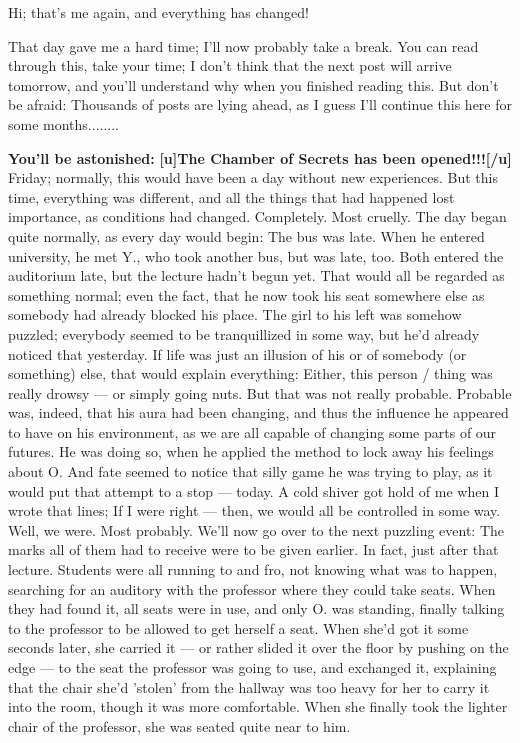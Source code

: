 Hi; that's me again, and everything has changed!

That day gave me a hard time; I'll now probably take a break. You can read through this, take your time; I don't think that the next post will arrive tomorrow, and you'll understand why when you finished reading this. 
But don't be afraid: Thousands of posts are lying ahead, as I guess I'll continue this here for some months........

\textbf{You'll be astonished:}
\textbf{[u]The Chamber of Secrets has been opened!!![/u]}
Friday; normally, this would have been a day without new experiences. But this time, everything was different, and all the things that had happened lost importance, as conditions had changed. 
Completely. 
Most cruelly. 
The day began quite normally, as every day would begin: The bus was late. 
When he entered university, he met Y., who took another bus, but was late, too. 
Both entered the auditorium late, but the lecture hadn't begun yet. 
That would all be regarded as something normal; even the fact, that he now took his seat somewhere else as somebody had already blocked his place. 
The girl to his left was somehow puzzled; everybody seemed to be tranquillized in some way, but he'd already noticed that yesterday. If life was just an illusion of his or of somebody (or something) else, that would explain everything: Either, this person / thing was really drowsy --- or simply going nuts. 
But that was not really probable. 
Probable was, indeed, that his aura had been changing, and thus the influence he appeared to have on his environment, as we are all capable of changing some parts of our futures. 
He was doing so, when he applied the method to lock away his feelings about O. 
And fate seemed to notice that silly game he was trying to play, as it would put that attempt to a stop --- today. 
A cold shiver got hold of me when I wrote that lines; If I were right --- then, we would all be controlled in some way. 
Well, we were. 
Most probably. 
We'll now go over to the next puzzling event: The marks all of them had to receive were to be given earlier. 
In fact, just after that lecture. 
Students were all running to and fro, not knowing what was to happen, searching for an auditory with the professor where they could take seats. 
When they had found it, all seats were in use, and only O. was standing, finally talking to the professor to be allowed to get herself a seat. 
When she'd got it some seconds later, she carried it --- or rather slided it over the floor by pushing on the edge --- to the seat the professor was going to use, and exchanged it, explaining that the chair she'd 'stolen' from the hallway was too heavy for her to carry it into the room, though it was more comfortable. When she finally took the lighter chair of the professor, she was seated quite near to him. 
